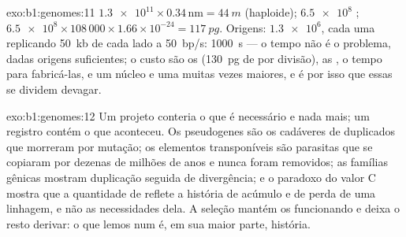 \begin{solution}{exo:b1:genomes:11}
$\num{1.3e11}\times 0.34\,\mathrm{nm} = \qty{44}{m}$ (haploide);
$\num{6.5e8}$ ;  $\num{6.5e8}\times 108\,000\times
1.66\times 10^{-24} = \qty{117}{pg}$. Origens: $\num{1.3e6}$, cada uma
replicando \qty{50}{kb} de cada lado a \qty{50}{bp/s}: \qty{1000}{s} ---
o tempo não é o problema, dadas origens suficientes; o custo são os
 (\qty{130}{pg} de  por divisão), as , o tempo
para fabricá-las, e um núcleo e uma  muitas vezes maiores, e é por
isso que essas  se dividem devagar.
\end{solution}

\begin{solution}{exo:b1:genomes:12}
Um projeto conteria o que é necessário e nada mais; um registro contém o
que aconteceu. Os pseudogenes são os cadáveres de  duplicados que
morreram por mutação; os elementos transponíveis são parasitas que se
copiaram por dezenas de milhões de anos e nunca foram removidos; as
famílias gênicas mostram duplicação seguida de divergência; e o paradoxo
do valor C mostra que a quantidade de  reflete a história de acúmulo
e de perda de uma linhagem, e não as necessidades dela. A seleção mantém
os  funcionando e deixa o resto derivar: o que lemos num  é,
em sua maior parte, história.
\end{solution}

